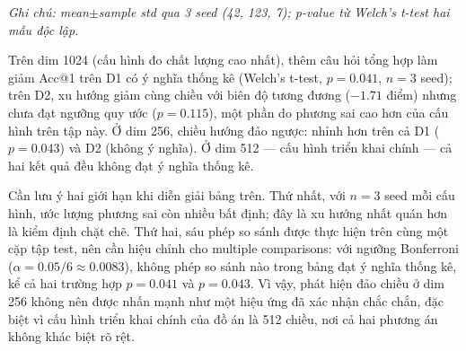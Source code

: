 \documentclass[../DoAn.tex]{subfiles}
\begin{document}
\begin{table}[H]
    \centering
    \caption{So sánh baseline và with\_gen qua 3 seed (Acc@1, \%)}
    \label{tab:embedding-querygen-ablation}
    {\small
    \setlength{\tabcolsep}{4pt}
    }

    \vspace{2mm} {\footnotesize \textit{Ghi chú: mean$\pm$sample std qua 3 seed (42, 123, 7); p-value từ Welch's t-test hai mẫu độc lập.}}
\end{table}

Trên dim 1024 (cấu hình đo chất lượng cao nhất), thêm câu hỏi tổng hợp làm giảm Acc@1 trên D1 có ý nghĩa thống kê (Welch's t-test, $p=0.041$, $n=3$ seed); trên D2, xu hướng giảm cùng chiều với biên độ tương đương ($-1.71$ điểm) nhưng chưa đạt ngưỡng quy ước ($p=0.115$), một phần do phương sai cao hơn của cấu hình  trên tập này. Ở dim 256, chiều hướng đảo ngược:  nhỉnh hơn trên cả D1 ($p=0.043$) và D2 (không ý nghĩa). Ở dim 512 --- cấu hình triển khai chính --- cả hai kết quả đều không đạt ý nghĩa thống kê.

Cần lưu ý hai giới hạn khi diễn giải bảng trên. Thứ nhất, với $n=3$ seed mỗi cấu hình, ước lượng phương sai còn nhiều bất định; đây là xu hướng nhất quán hơn là kiểm định chặt chẽ. Thứ hai, sáu phép so sánh được thực hiện trên cùng một cặp tập test, nên cần hiệu chỉnh cho multiple comparisons: với ngưỡng Bonferroni ($\alpha = 0.05/6 \approx 0.0083$), không phép so sánh nào trong bảng đạt ý nghĩa thống kê, kể cả hai trường hợp $p=0.041$ và $p=0.043$. Vì vậy, phát hiện đảo chiều ở dim 256 không nên được nhấn mạnh như một hiệu ứng đã xác nhận chắc chắn, đặc biệt vì cấu hình triển khai chính của đồ án là 512 chiều, nơi cả hai phương án không khác biệt rõ rệt.
\end{document}
